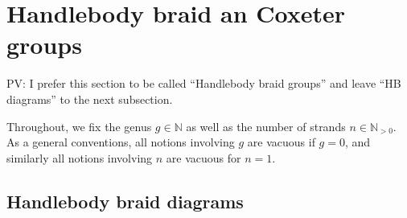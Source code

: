 \documentclass[a4paper,11pt]{amsart}
\newcommand{\N}{\mathbb{N}}
\def\PV#1{\textcolor[rgb]{0.00,0.00,1.00}{PV: #1}}
\numberwithin{equation}{section}
\begin{document}
\section{Handlebody braid an Coxeter groups}\label{section:braids}
\PV{I prefer this section to be called ``Handlebody braid groups'' and leave ``HB diagrams'' to the next subsection.}

Throughout, we fix the genus $g\in\N$ as well as the number of strands $n\in\N_{>0}$. As 
a general conventions, all notions involving $g$ are vacuous if $g=0$, and similarly all notions involving $n$ are vacuous for $n=1$.

\subsection{Handlebody braid diagrams}\label{subsection:braids}
\end{document}
